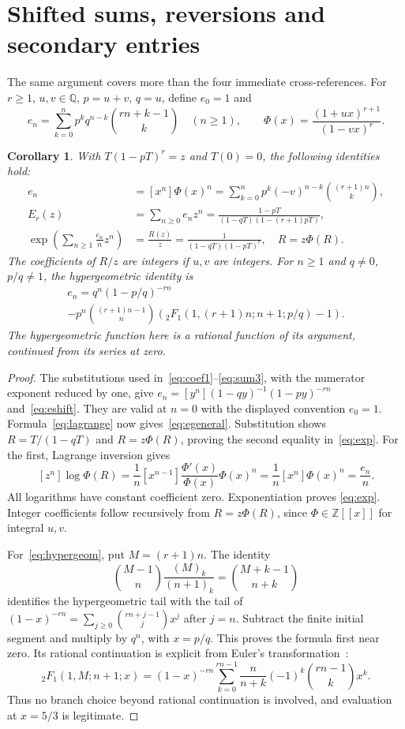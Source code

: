 \documentclass[11pt]{article}
\newtheorem{corollary}[theorem]{Corollary}
\newcommand{\Q}{\mathbb{Q}}
\begin{document}
\section{Shifted sums, reversions and secondary entries}
The same argument covers more than the four immediate cross-references.
For $r\geq1$, $u,v\in\Q$, $p=u+v$, $q=u$, define $e_0=1$ and
\[
 e_n=\sum_{k=0}^n p^kq^{n-k}\binom{rn+k-1}{k}\quad(n\geq1),
 \qquad \Phi(x)=\frac{(1+ux)^{r+1}}{(1-vx)^r}.
\]
\begin{corollary}\label{cor:shifted}
With $T(1-pT)^r=z$ and $T(0)=0$, the following identities hold:
\begin{align}
 e_n&=[x^n]\Phi(x)^n
 =\sum_{k=0}^np^k(-v)^{n-k}\binom{(r+1)n}{k},\label{eq:eshift}\\
 E_r(z)&=\sum_{n\geq0}e_nz^n
 =\frac{1-pT}{(1-qT)(1-(r+1)pT)},\label{eq:egeneral}\\
 \exp\left(\sum_{n\geq1}\frac{e_n}{n}z^n\right)
 &=\frac{R(z)}z=\frac{1}{(1-qT)(1-pT)^r},
 \quad R=z\Phi(R).\label{eq:exp}
\end{align}
The coefficients of $R/z$ are integers if $u,v$ are integers.
For $n\geq1$ and $q\ne0$, $p/q\ne1$, the hypergeometric identity is
\begin{multline}\label{eq:hypergeom}
 e_n=q^n(1-p/q)^{-rn}\\
 -p^n\binom{(r+1)n-1}{n}
 \left({}_2F_1(1,(r+1)n;n+1;p/q)-1\right).
\end{multline}
The hypergeometric function here is a rational function of its argument,
continued from its series at zero.
\end{corollary}
\begin{proof}
The substitutions used in~\eqref{eq:coef1}--\eqref{eq:sum3}, with the
numerator exponent reduced by one, give
$e_n=[y^n](1-qy)^{-1}(1-py)^{-rn}$ and~\eqref{eq:eshift}.
They are valid at $n=0$ with the displayed convention $e_0=1$.
Formula~\eqref{eq:lagrange} now gives~\eqref{eq:egeneral}.
Substitution shows $R=T/(1-qT)$ and $R=z\Phi(R)$, proving the
second equality in~\eqref{eq:exp}. For the first, Lagrange inversion gives
\[
 [z^n]\log\Phi(R)
 =\frac1n[x^{n-1}]\frac{\Phi'(x)}{\Phi(x)}\Phi(x)^n
 =\frac1n[x^n]\Phi(x)^n=\frac{e_n}{n}.
\]
All logarithms have constant coefficient zero. Exponentiation proves
\eqref{eq:exp}. Integer coefficients follow recursively from
$R=z\Phi(R)$, since $\Phi\in\mathbb Z[[x]]$ for integral $u,v$.

For~\eqref{eq:hypergeom}, put $M=(r+1)n$. The identity
\[
 \binom{M-1}{n}\frac{(M)_k}{(n+1)_k}
 =\binom{M+k-1}{n+k}
\]
identifies the hypergeometric tail with the tail of
$(1-x)^{-rn}=\sum_{j\geq0}\binom{rn+j-1}{j}x^j$ after $j=n$.
Subtract the finite initial segment and multiply by $q^n$, with $x=p/q$.
This proves the formula first near zero. Its rational continuation is
explicit from Euler's transformation~\cite[15.8.1]{dlmf}:
\[
 {}_2F_1(1,M;n+1;x)
 =(1-x)^{-rn}\sum_{k=0}^{rn-1}
       \frac{n}{n+k}(-1)^k\binom{rn-1}{k}x^k.
\]
Thus no branch choice beyond rational continuation is involved, and
evaluation at $x=5/3$ is legitimate.
\end{proof}
\end{document}
